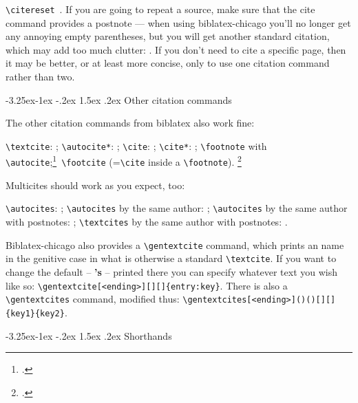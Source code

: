 \documentclass[a4paper,12pt]{article}
\makeatletter
\newcommand{\cmd}[1]{\texttt{\textbackslash #1}}
\renewcommand{\section}{\@startsection{section}{1}{\z@}%
                                     {-3.25ex\@plus -1ex \@minus -.2ex}%
                                     {1.5ex \@plus .2ex}%
                                     {\normalfont\large\bfseries}}
\makeatother
\begin{document}
\citereset\cmd{citereset}\ \autocite[15.27]{chicago:manual}.  If you
are going to repeat a source, make sure that the cite command provides
a postnote --- when using \textsf{biblatex-chicago} you'll no longer
get any annoying empty parentheses, but you will get another standard
citation, which may add too much clutter: \autocite{chicago:manual}.
If you don't need to cite a specific page, then it may be better, or
at least more concise, only to use one citation command rather than
two.

\section{Other citation commands}
\label{sec:other}

The other  citation commands from
\textsf{biblatex} also work fine:

\cmd{textcite}: \textcite{conley:fifthgrade}; \cmd{autocite*}:
\autocite*{connell:chronic}; \cmd{cite}: \cite{conway:evolution};
\cmd{cite*}: \cite*{davenport:attention}; \cmd{foot\-note} with
\cmd{autocite};\footnote{\autocite{donne:var}.}\ \cmd{footcite}
(=\cmd{cite} inside a \cmd{footnote}).  \footcite{dunn:revolutions}

Multicites should work as you expect, too:

\cmd{autocites}: \autocites{dyna:browser}{eliot:pound};
\cmd{autocites} by the same author:
\autocites{pirumova}{pirumova:russian}; \cmd{autocites} by the same
author with postnotes: \autocites{pirumova}[14]{pirumova:russian};
\cmd{textcites} by the same author with postnotes:
\textcites[37]{pirumova}{pirumova:russian}.

\textsf{Biblatex-chicago} also provides a \cmd{gentextcite} command,
which prints an  name in the genitive
case in what is otherwise a standard \cmd{textcite}.  If you want to
change the default -- \textbf{'s} -- printed there you can specify
whatever text you wish like so:
\cmd{gentextcite[<ending>][][]\{entry:key\}}.  There is also a
\cmd{gentextcites} command, modified thus:
\cmd{gentextcites[<ending>]()()[][]\{key1\}\{key2\}}.

\section{Shorthands}
\label{sec:shorthands}
\end{document}
